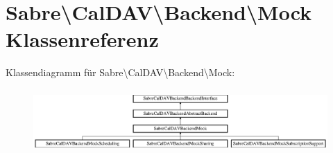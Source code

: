 \hypertarget{class_sabre_1_1_cal_d_a_v_1_1_backend_1_1_mock}{}\section{Sabre\textbackslash{}Cal\+D\+AV\textbackslash{}Backend\textbackslash{}Mock Klassenreferenz}
\label{class_sabre_1_1_cal_d_a_v_1_1_backend_1_1_mock}
Klassendiagramm für Sabre\textbackslash{}Cal\+D\+AV\textbackslash{}Backend\textbackslash{}Mock\+:\begin{figure}[H]
\begin{center}
\leavevmode
\includegraphics[height=2.440087cm]{class_sabre_1_1_cal_d_a_v_1_1_backend_1_1_mock}
\end{center}
\end{figure}

